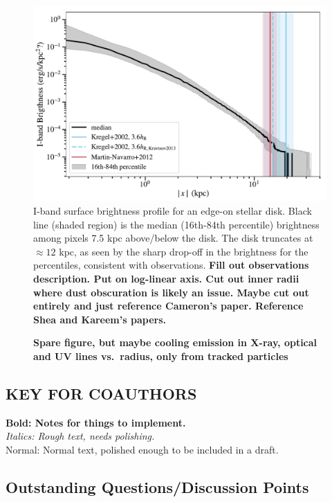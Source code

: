 \documentclass[fleqn,usenatbib]{mnras}
\begin{document}
\begin{figure}
\centering
\includegraphics[width=\columnwidth]{figures/brightness_profile.pdf}
\caption{
I-band surface brightness profile for an edge-on stellar disk.
Black line (shaded region) is the median (16th-84th percentile) brightness among pixels 7.5 kpc above/below the disk.
The disk truncates at $\approx 12$ kpc, as seen by the sharp drop-off in the brightness for the percentiles, consistent with observations.
\textbf{
Fill out observations description.
Put on log-linear axis.
Cut out inner radii where dust obscuration is likely an issue.
Maybe cut out entirely and just reference Cameron's paper.
Reference Shea and Kareem's papers.
}
}
\label{f:stellar_profile}
\end{figure}

\begin{figure}
    \centering
    \caption{
    \textbf{Spare figure, but maybe
    cooling emission in X-ray, optical and UV lines vs.\ radius, only from tracked particles
    }
    }
    \label{f: emission}
\end{figure}

\subsection{KEY FOR COAUTHORS}
\textbf{Bold: Notes for things to implement.} \\
\textit{Italics: Rough text, needs polishing.} \\
Normal: Normal text, polished enough to be included in a draft.

\subsection{Outstanding Questions/Discussion Points}
\end{document}
